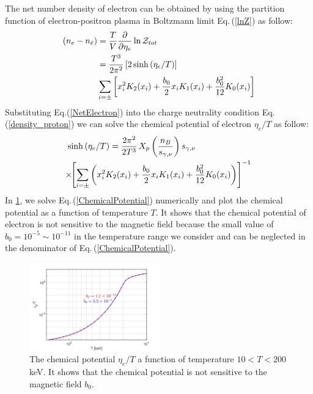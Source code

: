 \documentclass[twocolumn,preprintnumbers,amsmath,amssymb]{revtex4-2}
\newcommand{\req}[1]{Eq.\,({\ref{#1}})}
\begin{document}
The net number density of electron can be obtained by using the partition function of electron-positron plasma in Boltzmann limit \req{lnZ} as follow:
\begin{align}\label{NetElectron}
\left(n_e-n_{\bar e}\right)&=\frac{T}{V}\frac{\partial}{\partial \eta_{e}}\ln\mathcal{Z}_{tot}\notag\\
&=\frac{T^3}{2\pi^2}\left[2\sinh{(\eta_{e}/T)}\right]\notag\\&\sum_{i=\pm}\left[x_i^2K_2(x_i)+\frac{b_0}{2}x_i K_1(x_i)+\frac{b^2_0}{12}K_0(x_i)\right]
\end{align}
Substituting Eq.(\ref{NetElectron}) into the charge neutrality condition Eq.(\ref{density_proton}) we can solve the chemical potential of electron $\eta_e/T$ as follow:
\begin{align}\label{ChemicalPotential}
&\sinh{(\eta_{e}/T)}=\frac{2\pi^2}{2T^3}\,X_p\left(\frac{n_B}{s_{\gamma,\nu}}\right)s_{\gamma,\nu}\notag\\
&\!\!\times\!\!\left[\sum_{i=\pm}\left(x_i^2K_2(x_i)+\frac{b_0}{2}x_i K_1(x_i)+\frac{b^2_0}{12}K_0(x_i)\right)\right]^{-1}
\end{align}
In {\ref{chemical_fig}}, we solve \req{ChemicalPotential} numerically and plot the chemical potential as a function of temperature $T$. It shows that the chemical potential of electron is not sensitive to the magnetic field because the small value of $b_0=10^{-5}\sim10^{-11}$ in the temperature range we consider and can be neglected in the denominator of \req{ChemicalPotential}. 
\begin{figure}[ht]
\centering
\includegraphics[width=0.5\textwidth]{./plots/ChemicalPotentialFinal_200keV.jpg}
\caption{The chemical potential $\eta_{e}/T$ a function of temperature $10<T<200$ keV. It shows that the chemical potential is not sensitive to the magnetic field $b_0$.}
\label{chemical_fig} 
\end{figure}
\end{document}
